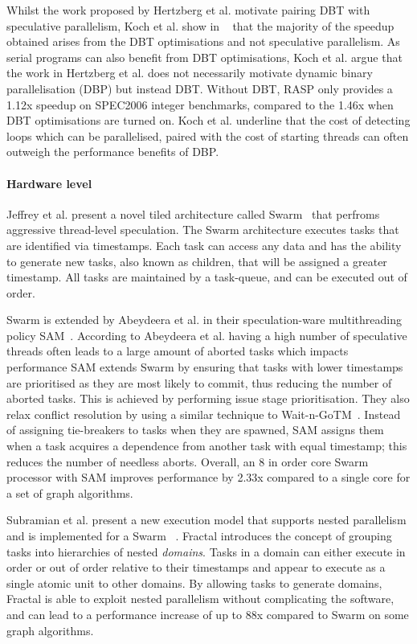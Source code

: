 Whilst the work proposed by Hertzberg et al. motivate pairing DBT with speculative parallelism, Koch et al. show in ~\cite{koch2013spec} that the majority of the speedup obtained arises from the DBT optimisations and not speculative parallelism.
As serial programs can also benefit from DBT optimisations, Koch et al. argue that the work in Hertzberg et al. does not necessarily motivate dynamic binary parallelisation (DBP) but instead DBT.
Without DBT, RASP only provides a 1.12x speedup on SPEC2006 integer benchmarks, compared to the 1.46x when DBT optimisations are turned on.
Koch et al. underline that the cost of detecting loops which can be parallelised, paired with the cost of starting threads can often outweigh the performance benefits of DBP.
 
\paragraph*{Hardware level}
Jeffrey et al. present a novel tiled architecture called Swarm~\cite{swarm2016} that perfroms aggressive thread-level speculation.
The Swarm architecture executes tasks that are identified via timestamps.
Each task can access any data and has the ability to generate new tasks, also known as children, that will be assigned a greater timestamp.
All tasks are maintained by a task-queue, and can be executed out of order.

Swarm is extended by Abeydeera et al. in their speculation-ware multithreading policy SAM~\cite{Abeydeera2017SpecMulti}.
According to Abeydeera et al. having a high number of speculative threads often leads to a large amount of aborted tasks which impacts performance
SAM extends Swarm by ensuring that tasks with lower timestamps are prioritised as they are most likely to commit, thus reducing the number of aborted tasks.
This is achieved by performing issue stage prioritisation.
They also relax conflict resolution by using a similar technique to Wait-n-GoTM~\cite{waitNGo2013}.
Instead of assigning tie-breakers to tasks when they are spawned, SAM assigns them when a task acquires a dependence from another task with equal timestamp; this reduces the number of needless aborts.
Overall, an 8 in order core Swarm processor with SAM improves performance by 2.33x compared to a single core for a set of graph algorithms.

Subramian et al. present a new execution model that supports nested parallelism and is implemented for a Swarm~\cite{fractal2017} .
Fractal introduces the concept of grouping tasks into hierarchies of nested \textit{domains}.
Tasks in a domain can either execute in order or out of order relative to their timestamps and appear to execute as a single atomic unit to other domains.
By allowing tasks to generate domains, Fractal is able to exploit nested parallelism without complicating the software, and can lead to a performance increase of up to 88x compared to Swarm on some graph algorithms.

